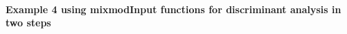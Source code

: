 









\paragraph{Example 4 using mixmodInput functions for discriminant analysis in two steps\\}

